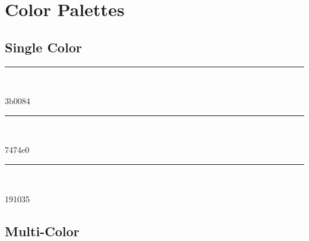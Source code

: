 \section{Color Palettes}

\newcommand\cp[1]{%
  \textcolor[HTML]{#1}{\rule{10pt}{10pt}}
  ~\hspace{5pt}
  ~\parbox[c][10pt][c]{60pt}{#1}
}
\newcommand\csep{%
  \hspace{1pt}
}

\subsection{Single Color}

\cp{3b0084}\csep
\cp{7474e0}\csep
\cp{191035}
\par

\subsection{Multi-Color}


